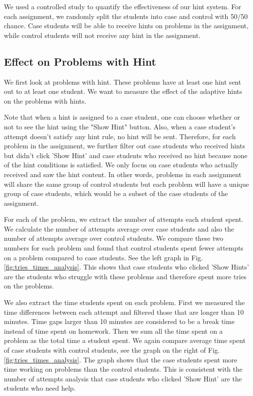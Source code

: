 \documentclass{llncs}
\begin{document}
We used a controlled study to quantify the effectiveness of our hint system. For each assignment, we randomly split the students into case and control with 50/50 chance. Case students will be able to receive hints on problems in the assignment, while control students will not receive any hint in the assignment.

\subsection{Effect on Problems with Hint}
We first look at problems with hint. These problems have at least one hint sent out to at least one student. We want to measure the effect of the adaptive hints on the problems with hints.

Note that when a hint is assigned to a case student, one can choose whether or not to see the hint using the "Show Hint" button. Also, when a case student's attempt doesn't satisfy any hint rule, no hint will be sent. Therefore, for each problem in the assignment, we further filter out case students who received hints but didn't click 'Show Hint' and case students who received no hint because none of the hint conditions is satisfied. We only focus on case students who actually received and saw the hint content. In other words, problems in each assignment will share the same group of control students but each problem will have a unique group of case students, which would be a subset of the case students of the assignment.

For each of the problem, we extract the number of attempts each student spent. We calculate the number of attempts average over case students and also the number of attempts average over control students. We compare these two numbers for each problem and found that control students spent fewer attempts on a problem compared to case students. See the left graph in Fig. \ref{fig:tries_times_analysis}. This shows that case students who clicked 'Show Hints' are the students who struggle with these problems and therefore spent more tries on the problems.

We also extract the time students spent on each problem. First we measured the time differences between each attempt and filtered those that are longer than 10 minutes. Time gaps larger than 10 minutes are considered to be a break time instead of time spent on homework. Then we sum all the time spent on a problem as the total time a student spent. We again compare average time spent of case students with control students, see the graph on the right of Fig. \ref{fig:tries_times_analysis}. The graph shows that the case students spent more time working on problems than the control students. This is consistent with the number of attempts analysis that case students who clicked 'Show Hint' are the students who need help.
\end{document}
